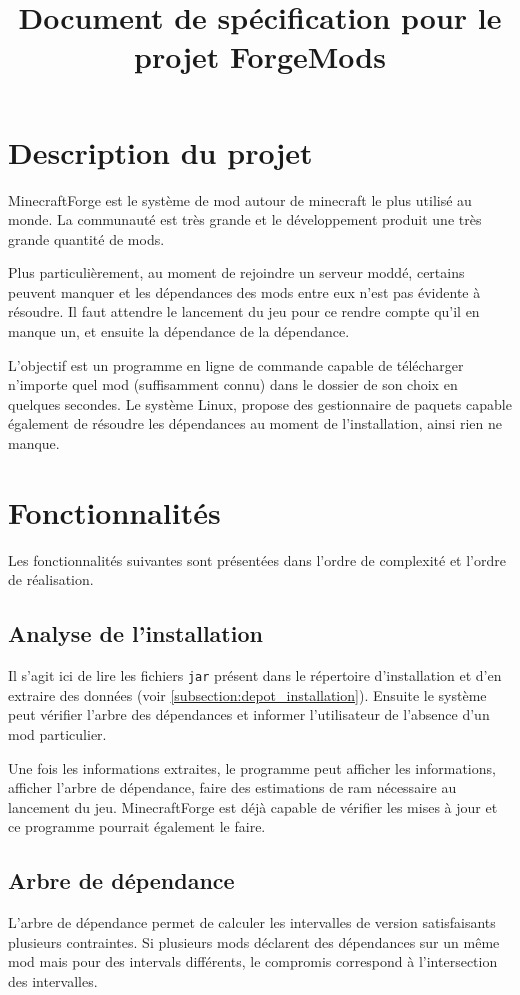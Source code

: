\documentclass{article}
\title{Document de spécification pour le projet ForgeMods}
\begin{document}
\maketitle
\tableofcontents

\section{Description du projet}
MinecraftForge est le système de mod autour de minecraft le plus utilisé au monde.
La communauté est très grande et le développement produit une très grande quantité de mods.

Plus particulièrement, au moment de rejoindre un serveur moddé, certains peuvent manquer et les dépendances des mods entre eux n'est pas évidente à résoudre.
Il faut attendre le lancement du jeu pour ce rendre compte qu'il en manque un, et ensuite la dépendance de la dépendance.

L'objectif est un programme en ligne de commande capable de télécharger n'importe quel mod (suffisamment connu) dans le dossier de son choix en quelques secondes.
Le système Linux, propose des gestionnaire de paquets capable également de résoudre les dépendances au moment de l'installation, ainsi rien ne manque.


\section{Fonctionnalités}
Les fonctionnalités suivantes sont présentées dans l'ordre de complexité et l'ordre de réalisation.

\subsection{Analyse de l'installation}
Il s'agit ici de lire les fichiers \texttt{jar} présent dans le répertoire d'installation et d'en extraire des données (voir \ref{subsection:depot_installation}).
Ensuite le système peut vérifier l'arbre des dépendances et informer l'utilisateur de l'absence d'un mod particulier.

Une fois les informations extraites, le programme peut afficher les informations, afficher l'arbre de dépendance, faire des estimations de ram nécessaire au lancement du jeu.
MinecraftForge est déjà capable de vérifier les mises à jour et ce programme pourrait également le faire.


\subsection{Arbre de dépendance}
L'arbre de dépendance permet de calculer les intervalles de version satisfaisants plusieurs contraintes.
Si plusieurs mods déclarent des dépendances sur un même mod mais pour des intervals différents, le compromis correspond à l'intersection des intervalles.
\end{document}
